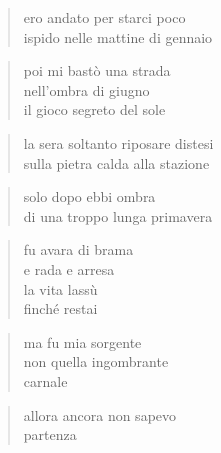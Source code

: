 \begin{verse}
    ero andato per starci poco\\
    ispido nelle mattine di gennaio
\end{verse}

\begin{verse}
    poi mi bastò una strada\\
    nell'ombra di giugno\\
    il gioco segreto del sole
\end{verse}

\begin{verse}
    la sera soltanto riposare distesi\\
    sulla pietra calda alla stazione
\end{verse}

\begin{verse}
    solo dopo ebbi ombra\\
    di una troppo lunga primavera
\end{verse}

\clearpage


\begin{verse}
    fu avara di brama\\
    e rada e arresa\\
    la vita lassù\\
    finché restai
\end{verse}

\begin{verse}
    ma fu mia sorgente\\
    non quella ingombrante\\
    carnale
\end{verse}

\begin{verse}
    allora ancora non sapevo\\
    partenza
\end{verse}
